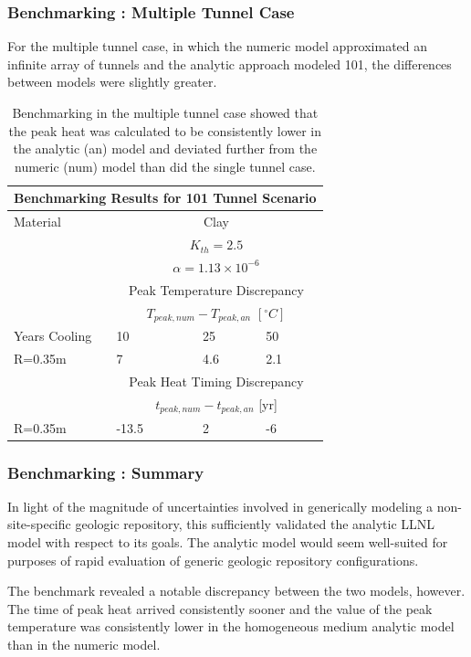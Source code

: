 \begin{frame}
  \frametitle{Benchmarking : Multiple Tunnel Case }
For the multiple tunnel case, in which the numeric model 
approximated an infinite array of tunnels and the analytic approach modeled 101, 
the differences between models were slightly greater. 
\begin{table}
  \centering
  \footnotesize{
  \begin{tabular}{|l|l|l|l|}
    \multicolumn{4}{c}{\textbf{Benchmarking Results for 101 Tunnel Scenario}}\\
    \hline
    Material & \multicolumn{3}{|c|}{Clay} \\
    & \multicolumn{3}{|c|}{$K_{th}=2.5$}\\ 
    & \multicolumn{3}{|c|}{$\alpha=1.13\times10^{-6}$}  \\
    \hline
    & \multicolumn{3}{|c|}{Peak Temperature Discrepancy} \\
    & \multicolumn{3}{|c|}{$T_{peak,num}-T_{peak,an}$ $[^{\circ}C]$} \\
    \hline
    Years Cooling  & 10  & 25 & 50 \\
    \hline
    R=0.35m   & 7 & 4.6 & 2.1 \\
    \hline
    &\multicolumn{3}{|c|}{Peak Heat Timing Discrepancy}\\
    &\multicolumn{3}{|c|}{ $t_{peak,num}-t_{peak,an}$ [yr]} \\
    \hline
    R=0.35m       & -13.5   & 2   & -6  \\
    \hline
  \end{tabular}
  \caption{Benchmarking in the multiple tunnel case showed that the peak heat was 
  calculated to be consistently lower in the analytic (an) model and deviated further
  from the numeric (num)  model than did the single tunnel case.
  }
  \label{tab:benchMulti}
  }
\end{table}

\end{frame}


\begin{frame}
  \frametitle{Benchmarking : Summary}

In light of the magnitude of uncertainties involved in generically modeling a 
non-site-specific geologic repository, this sufficiently validated the analytic 
LLNL model with respect to its goals.  The analytic model would seem 
well-suited for purposes of rapid evaluation of generic geologic repository 
configurations. 

The benchmark revealed a notable discrepancy between the two models, 
however. The time of peak heat arrived consistently sooner and the value of the 
peak temperature was consistently lower in the homogeneous medium analytic
model than in the numeric model. 
\end{frame}

